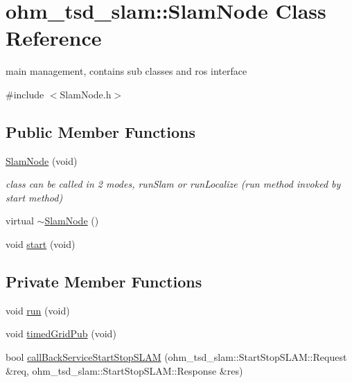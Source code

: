 \hypertarget{classohm__tsd__slam_1_1SlamNode}{\section{ohm\-\_\-tsd\-\_\-slam\-:\-:Slam\-Node Class Reference}
\label{classohm__tsd__slam_1_1SlamNode}
}


main management, contains sub classes and ros interface  




{\ttfamily \#include $<$Slam\-Node.\-h$>$}

\subsection*{Public Member Functions}
\begin{DoxyCompactItemize}
\item 
\hyperlink{classohm__tsd__slam_1_1SlamNode_a53405334bd8bd96a906d12fbee18a0f3}{Slam\-Node} (void)
\begin{DoxyCompactList}\small\item\em class can be called in 2 modes, run\-Slam or run\-Localize (run method invoked by start method) \end{DoxyCompactList}\item 
virtual \hyperlink{classohm__tsd__slam_1_1SlamNode_afa406b71eeedebc517f8af86da11cfe1}{$\sim$\-Slam\-Node} ()
\item 
void \hyperlink{classohm__tsd__slam_1_1SlamNode_aab61ed9a47da67c158575fff0c1bedf0}{start} (void)
\end{DoxyCompactItemize}
\subsection*{Private Member Functions}
\begin{DoxyCompactItemize}
\item 
void \hyperlink{classohm__tsd__slam_1_1SlamNode_a4bd9154e7b2003ab45422bfd8df1ad39}{run} (void)
\item 
void \hyperlink{classohm__tsd__slam_1_1SlamNode_a4b997ce8018bf1f309dbe696a63b4a3b}{timed\-Grid\-Pub} (void)
\item 
bool \hyperlink{classohm__tsd__slam_1_1SlamNode_a413d9367bda74b0eba88beae030fe484}{call\-Back\-Service\-Start\-Stop\-S\-L\-A\-M} (ohm\-\_\-tsd\-\_\-slam\-::\-Start\-Stop\-S\-L\-A\-M\-::\-Request \&req, ohm\-\_\-tsd\-\_\-slam\-::\-Start\-Stop\-S\-L\-A\-M\-::\-Response \&res)
\end{DoxyCompactItemize}
